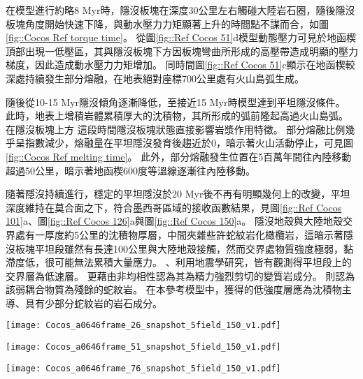 在模型進行約略8 Myr時，隱沒板塊在深度30公里左右觸碰大陸岩石圈，隨後隱沒板塊角度開始快速下降，與動水壓力力矩顯著上升的時間點不謀而合，如圖\ref{fig::Cocos Ref torque time}。
從圖\ref{fig::Ref Cocos 51}d模型動態壓力可見於地函楔頂部出現一低壓區，其與隱沒板塊下方因板塊彎曲所形成的高壓帶造成明顯的壓力梯度，因此造成動水壓力力矩增加。
同時間圖\ref{fig::Ref Cocos 51}c顯示在地函楔較深處持續發生部分熔融，在地表絕對座標700公里處有火山島弧生成。

隨後從10-15 Myr隱沒傾角逐漸降低，至接近15 Myr時模型達到平坦隱沒條件。
此時，地表上增積岩體累積厚大的沈積物，其所形成的弧前隆起高過火山島弧。
在隱沒板塊上方
這段時間隱沒板塊狀態直接影響岩漿作用特徵。
部分熔融比例幾乎呈指數減少，熔融量在平坦隱沒發育後趨近於0，暗示著火山活動停止，可見圖\ref{fig::Cocos Ref melting time}。
此外，部分熔融發生位置在5百萬年間往內陸移動超過50公里，暗示著地函楔600度等溫線逐漸往內陸移動。

隨著隱沒持續進行，穩定的平坦隱沒於20 Myr後不再有明顯幾何上的改變，平坦深度維持在莫合面之下，符合墨西哥區域的接收函數結果，見圖\ref{fig::Ref Cocos 101}a、圖\ref{fig::Ref Cocos 126}a與圖\ref{fig::Ref Cocos 150}a。
隱沒地殼與大陸地殼交界處有一厚度約5公里的沈積物厚層，中間夾雜些許蛇紋岩化橄欖岩，這暗示著隱沒板塊平坦段雖然有長達100公里與大陸地殼接觸，然而交界處物質強度極弱，黏滯度低，很可能無法累積大量應力。
\citealp{Song2009}、\citealp{Song2012SC}利用地震學研究，皆有觀測得平坦段上的交界層為低速層。
\citealp{Song2012SC}更藉由非均相性認為其為精力強烈剪切的變質岩成分。
\citealp{Manea2017}則認為該弱耦合物質為殘餘的蛇紋岩。
在本參考模型中，獲得的低強度層應為沈積物主導、具有少部分蛇紋岩的岩石成分。


\begin{figure*}[htp]
    \centering
    \texttt{[image: Cocos\_a0646frame\_26\_snapshot\_5field\_150\_v1.pdf]}
    \caption[科克斯參考模型於5 Myr時之結果]{科克斯參考模型於5 Myr時之結果。}
    \label{fig::Ref Cocos 26}
\end{figure*}

\begin{figure*}[htp]
    \centering
    \texttt{[image: Cocos\_a0646frame\_51\_snapshot\_5field\_150\_v1.pdf]}
    \caption[科克斯參考模型於10 Myr時之結果]{科克斯參考模型於10 Myr時之結果。}
    \label{fig::Ref Cocos 51}
\end{figure*}

\begin{figure*}[htp]
    \centering
    \texttt{[image: Cocos\_a0646frame\_76\_snapshot\_5field\_150\_v1.pdf]}
    \caption[科克斯參考模型於15 Myr時之結果]{科克斯參考模型於15 Myr時之結果。}
    \label{fig::Ref Cocos 76}
\end{figure*}

